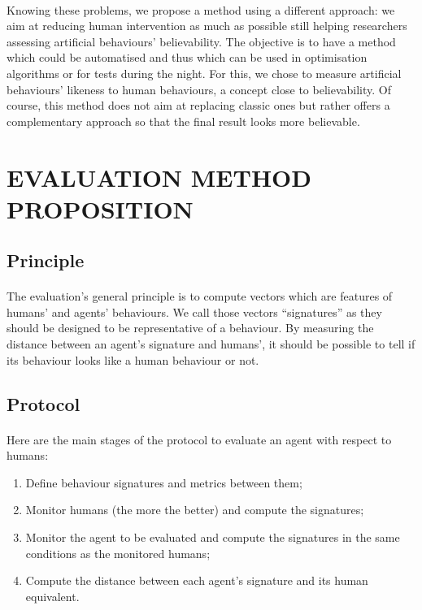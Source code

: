 \documentclass[a4paper,twocolumn]{article}
\begin{document}
\paragraph{}%
Knowing these problems, we propose a method using a different approach: we aim at reducing human intervention as much as possible still helping researchers assessing artificial behaviours' believability. The objective is to have a  method which could be automatised and thus which can be used in optimisation algorithms or for tests during the night. For this, we chose to measure artificial behaviours' likeness to human behaviours, a concept close to believability. Of course, this method does not aim at replacing classic ones but rather offers a complementary approach so that the final result looks more believable.

\section{EVALUATION METHOD PROPOSITION}
\subsection{Principle}
\paragraph{}%
The evaluation's general principle is to compute vectors which are features of humans' and agents' behaviours. We call those vectors ``signatures'' as they should be designed to be representative of a behaviour. By measuring the distance between an agent's signature and humans', it should be possible to tell if its behaviour looks like a human behaviour or not.
\subsection{Protocol}
\paragraph{}%
Here are the main stages of the protocol to evaluate an agent with respect to humans:
\begin{enumerate}
 \item Define behaviour signatures and metrics between them;
 \item Monitor humans (the more the better) and compute the signatures;
 \item Monitor the agent to be evaluated and compute the signatures in the same conditions as the monitored humans;
 \item Compute the distance between each agent's signature and its human equivalent.
\end{enumerate}
\end{document}
